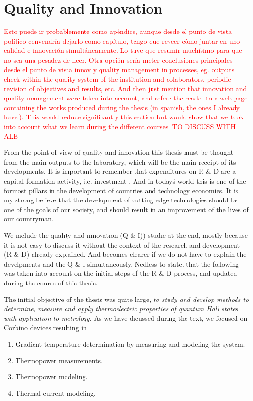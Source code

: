 \chapter{Quality and Innovation}
\label{ch:qi}


\textcolor{red}{Esto puede ir probablemente como apéndice, aunque desde el punto de vista político convendría dejarlo como capítulo, tengo que reveer cómo juntar en uno calidad e innovación simultáneamente. Lo tuve que resumir muchísimo para que no sea una pesadez de lleer. Otra opción sería meter conclusiones principales desde el punto de vista innov y quality management in processes, eg. outputs check within the quality system of the institution and colaborators, periodic revision of objectives and results, etc. And then just mention that innovation and quality management were taken into account, and refere the reader to a web page containing the works produced during the thesis (in spanish, the ones I already have.). This would reduce significantly this section but would show that we took into account what we learn during the different courses. TO DISCUSS WITH ALE}

From the point of view of quality and innovation this thesis must be thought from the main outputs to the laboratory, which will be the main receipt of its developments. It is important to remember that expenditures on R \& D are a capital formation activity, i.e. investment 
\cite[Foreword]{frascati}. And in today\'s world this is one of the formost pillars in the development of countries and technology economies. It is my strong believe that the development of cutting edge technologies should be one of the goals of our society, and should result in an improvement of the lives of our countryman. 

We include the quality and innovation (Q \& I)) studie at the end, mostly because it is not easy to discuss it without the context of the research and development (R \& D) already explained. And becomes clearer if we do not have to explain the develpments and the Q \& I simultaneously. Nedless to state, that the following was taken into account on the initial steps of the R \& D process, and updated during the course of this thesis.

The initial objective of the thesis was quite large, \textit{to study and develop methods to determine, measure and apply thermoelectric properties of quantum Hall states with application to metrology. } As we have dicussed during the text, we focused on Corbino devices resulting in 
\begin{enumerate}\label{enum:developments}
    \item Gradient temperature determination by measuring and modeling the system.
    \item Thermopower measurements.
    \item Thermopower modeling.
    \item Thermal current modeling.
\end{enumerate}


